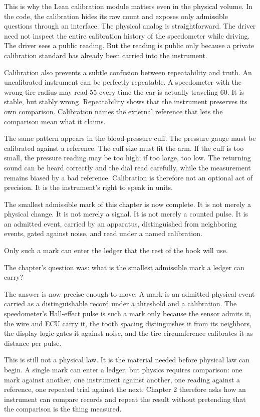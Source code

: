 This is why the Lean calibration module matters even in the physical volume. In
the code, the calibration hides its raw count and exposes only admissible
questions through an interface. The physical analog is straightforward. The
driver need not inspect the entire calibration history of the speedometer while
driving. The driver sees a public reading. But the reading is public only
because a private calibration standard has already been carried into the
instrument.

Calibration also prevents a subtle confusion between repeatability and truth. An
uncalibrated instrument can be perfectly repeatable. A speedometer with the
wrong tire radius may read 55 every time the car is actually traveling 60. It is
stable, but stably wrong. Repeatability shows that the instrument preserves its
own comparison. Calibration names the external reference that lets the
comparison mean what it claims.

The same pattern appears in the blood-pressure cuff. The pressure gauge must be
calibrated against a reference. The cuff size must fit the arm. If the cuff is
too small, the pressure reading may be too high; if too large, too low. The
returning sound can be heard correctly and the dial read carefully, while the
measurement remains biased by a bad reference. Calibration is therefore not an
optional act of precision. It is the instrument's right to speak in units.

The smallest admissible mark of this chapter is now complete. It is not merely a
physical change. It is not merely a signal. It is not merely a counted pulse. It
is an admitted event, carried by an apparatus, distinguished from neighboring
events, gated against noise, and read under a named calibration.

Only such a mark can enter the ledger that the rest of the book will use.

\begin{bridge}

The chapter's question was: what is the smallest admissible mark a ledger can
carry?

The answer is now precise enough to move. A mark is an admitted physical event
carried as a distinguishable record under a threshold and a calibration. The
speedometer's Hall-effect pulse is such a mark only because the sensor admits
it, the wire and ECU carry it, the tooth spacing distinguishes it from its
neighbors, the display logic gates it against noise, and the tire circumference
calibrates it as distance per pulse.

This is still not a physical law. It is the material needed before physical law
can begin. A single mark can enter a ledger, but physics requires comparison:
one mark against another, one instrument against another, one reading against a
reference, one repeated trial against the next. Chapter 2 therefore asks how an
instrument can compare records and repeat the result without pretending that
the comparison is the thing measured.

\end{bridge}

